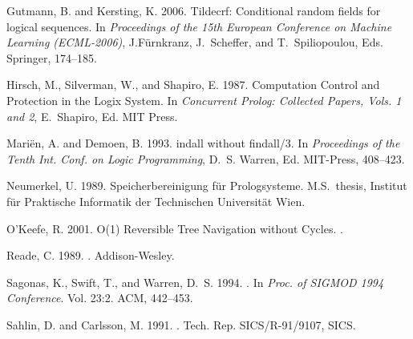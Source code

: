 \documentclass{tlp}
\begin{document}
\begin{thebibliography}{}
{\sc Gutmann, B.} {\sc and} {\sc Kersting, K.} 2006.
\newblock Tildecrf: Conditional random fields for logical sequences.
\newblock In {\em Proceedings of the 15th European Conference on Machine
  Learning (ECML-2006)}, {J.F{\"{u}}rnkranz}, {J.~Scheffer}, {and}
  {T.~Spiliopoulou}, Eds. Springer, 174--185.

{\sc Hirsch, M.}, {\sc Silverman, W.}, {\sc and} {\sc Shapiro, E.} 1987.
\newblock Computation {C}ontrol and {P}rotection in the {L}ogix {S}ystem.
\newblock In {\em Concurrent Prolog: Collected Papers, Vols. 1 and 2},
  {E.~Shapiro}, Ed. MIT Press.

{\sc Mari{\"{e}}n, A.} {\sc and} {\sc Demoen, B.} 1993.
indall without findall/3.
\newblock In {\em Proceedings of the Tenth Int. Conf. on Logic Programming},
  {D.~S. Warren}, Ed. MIT-Press, 408--423.

{\sc Neumerkel, U.} 1989.
\newblock Speicherbereinigung f{\"{u}}r {P}rologsysteme.
\newblock M.S.\ thesis, Institut f{\"{u}}r Praktische Informatik der
  Technischen Universit{\"{a}}t Wien.

{\sc O'Keefe, R.} 2001.
\newblock O(1) {R}eversible {T}ree {N}avigation without {C}ycles.
.

{\sc Reade, C.} 1989.
.
\newblock Addison-Wesley.

{\sc Sagonas, K.}, {\sc Swift, T.}, {\sc and} {\sc Warren, D.~S.} 1994.
.
\newblock In {\em Proc. of SIGMOD 1994 Conference}. Vol. 23:2. ACM, 442--453.

{\sc Sahlin, D.} {\sc and} {\sc Carlsson, M.} 1991.
.
\newblock Tech. Rep. {SICS/R-91/9107}, {SICS}.


\end{thebibliography}
\end{document}

